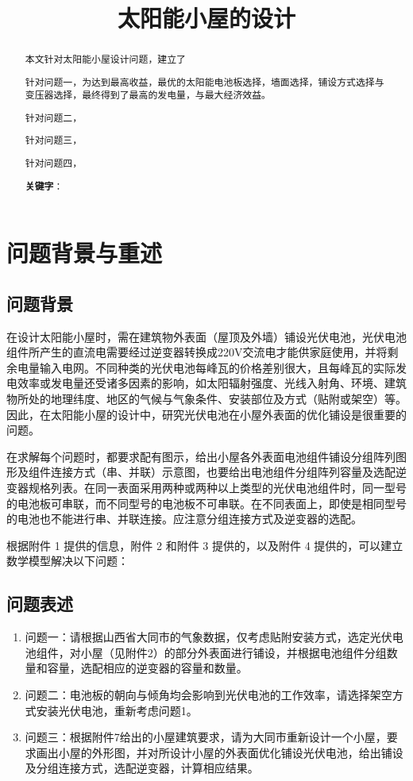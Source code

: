 \documentclass{ctexart}
\title{太阳能小屋的设计}
\date{}
\author{}
\begin{document}
    \maketitle
    \renewcommand{\abstractname}{\Large 摘要\\}
    \begin{abstract}
        \normalsize
        本文针对太阳能小屋设计问题，建立了
        
        针对问题一，为达到最高收益，最优的太阳能电池板选择，墙面选择，铺设方式选择与变压器选择，最终得到了最高的发电量，与最大经济效益。
        
        针对问题二，
        
        针对问题三，
        
        针对问题四，
        
        \textbf{关键字}：
    \end{abstract}
    \newpage
	\section{问题背景与重述}
	\subsection{问题背景}
    在设计太阳能小屋时，需在建筑物外表面（屋顶及外墙）铺设光伏电池，光伏电池组件所产生的直流电需要经过逆变器转换成220V交流电才能供家庭使用，并将剩余电量输入电网。不同种类的光伏电池每峰瓦的价格差别很大，且每峰瓦的实际发电效率或发电量还受诸多因素的影响，如太阳辐射强度、光线入射角、环境、建筑物所处的地理纬度、地区的气候与气象条件、安装部位及方式（贴附或架空）等。因此，在太阳能小屋的设计中，研究光伏电池在小屋外表面的优化铺设是很重要的问题。
    
    在求解每个问题时，都要求配有图示，给出小屋各外表面电池组件铺设分组阵列图形及组件连接方式（串、并联）示意图，也要给出电池组件分组阵列容量及选配逆变器规格列表。在同一表面采用两种或两种以上类型的光伏电池组件时，同一型号的电池板可串联，而不同型号的电池板不可串联。在不同表面上，即使是相同型号的电池也不能进行串、并联连接。应注意分组连接方式及逆变器的选配。
    
    根据附件 1 提供的信息，附件 2 和附件 3 提供的，以及附件 4 提供的，可以建立数学模型解决以下问题：
    
    \subsection{问题表述}
    \begin{enumerate}[(1)]
        \item 问题一：请根据山西省大同市的气象数据，仅考虑贴附安装方式，选定光伏电池组件，对小屋（见附件2）的部分外表面进行铺设，并根据电池组件分组数量和容量，选配相应的逆变器的容量和数量。
        \item 问题二：电池板的朝向与倾角均会影响到光伏电池的工作效率，请选择架空方式安装光伏电池，重新考虑问题1。
        \item 问题三：根据附件7给出的小屋建筑要求，请为大同市重新设计一个小屋，要求画出小屋的外形图，并对所设计小屋的外表面优化铺设光伏电池，给出铺设及分组连接方式，选配逆变器，计算相应结果。
    \end{enumerate}
\end{document}
